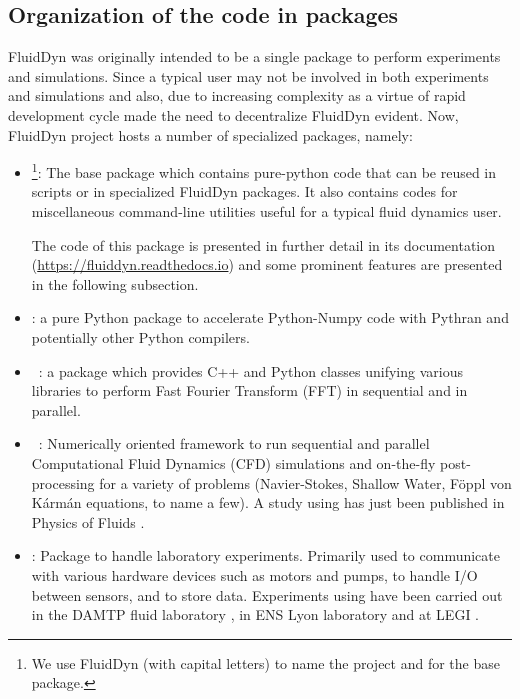 \documentclass{../jors}
\begin{document}
\subsection*{Organization of the code in packages}

FluidDyn was originally intended to be a single package to perform experiments
and simulations. Since a typical user may not be involved in both experiments
and simulations and also, due to increasing complexity as a virtue of rapid
development cycle made the need to decentralize FluidDyn evident.
Now, FluidDyn project hosts a number of specialized packages, namely:

\begin{itemize}
\item {}\footnote{We use FluidDyn (with capital letters) to name the
project and \fluiddyn for the base package.}: The base package which contains
pure-python code that can be reused in scripts or in specialized FluidDyn
packages. It also contains codes for miscellaneous command-line utilities useful
for a typical fluid dynamics user.

The code of this package is presented in further detail in its documentation
(\url{https://fluiddyn.readthedocs.io}) and some prominent features are presented
in the following subsection.

\item {}: a pure Python package to accelerate Python-Numpy code
with Pythran and potentially other Python compilers.

\item {}~\cite[see the companion paper][]{fluidfft}: a package which
provides C++ and Python classes unifying various libraries to perform Fast Fourier
Transform (FFT) in sequential and in parallel.

\item {}~\cite[see the companion paper][]{fluidsim}: Numerically
oriented framework to run sequential and parallel Computational Fluid Dynamics
(CFD) simulations and on-the-fly post-processing for a variety of problems
(Navier-Stokes, Shallow Water, F\"oppl von K\'arm\'an equations, to name a few).
A study using  has just been published in Physics of Fluids
\cite[]{LindborgMohanan2017}.

\item {}: Package to handle laboratory experiments. Primarily used to
communicate with various hardware devices such as motors and pumps, to handle I/O
between sensors, and to store data.
%
Experiments using  have been carried out in the DAMTP fluid
laboratory \cite[Cambridge,
UK. cf.][]{LeclercqPartridgeAugierDalzielKerswell2016}, in ENS Lyon laboratory
\cite[Lyon, France,][]{salort2018} and at LEGI \cite[Grenoble,
France,][]{ISSF2016}.


\end{itemize}
\end{document}
